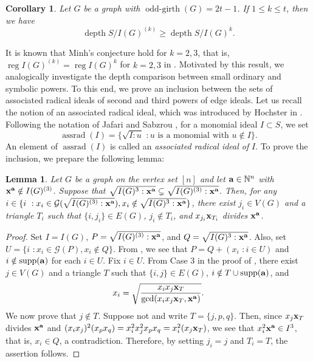 \documentclass[12pt]{amsart}
\newtheorem{cor}[thm]{Corollary}
\newtheorem{lemma}[thm]{Lemma}
\theoremstyle{definition}
\theoremstyle{remark}
\DeclareMathOperator{\depth}{depth}
\DeclareMathOperator{\supp}{supp}
\DeclareMathOperator{\reg}{reg}
\DeclareMathOperator{\ogirth}{odd-girth}
\DeclareMathOperator{\assrad}{assrad}
\begin{document}
\begin{cor}
Let $G$ be a graph with $\ogirth(G)=2t-1$. If $1\leq k\leq t$, then we have $$\depth S/I(G)^{(k)}\geq\depth S/I(G)^{k}.$$ 
\end{cor}

It is known that Minh's conjecture hold for $k=2,3$, that is, $\reg I(G)^{(k)}=\reg I(G)^{k}$ for $k=2,3$ in \cite[Theorem 1.1]{mnptv2022}. Motivated by this result, we analogically investigate the depth comparison between small ordinary and symbolic powers. To this end, we prove an inclusion between the sets of associated radical ideals of second and third powers of edge ideals. Let us recall the notion of an associated radical ideal, which was introduced by Hochster in \cite{h1977}. Following the notation of Jafari and Sabzrou \cite{js2019}, for a monomial ideal $I\subset S$, we set 
$$\assrad(I)=\{\sqrt{I:u}\,\,: u\mbox{ is a monomial with }u\notin I\}.$$
An element of $\assrad(I)$ is called an {\it associated radical ideal of }$I$. 
To prove the inclusion, we prepare the following lemma: 


\begin{lemma}\label{lemma for assrad}
Let $G$ be a graph on the vertex set $[n]$ and let ${\bf a}\in\mathbb{N}^{n}$ with ${\bf x}^{\bf a}\notin I(G)^{(3)}$. Suppose that $\sqrt{I(G)^{3}:{\bf x}^{\bf a}}\subsetneq\sqrt{I(G)^{(3)}:{\bf x}^{\bf a}}$. Then, for any $i\in\{i\,\,: x_{i}\in\mathcal{G}(\sqrt{I(G)^{(3)}:{\bf x}^{\bf a}}), x_{i}\notin \sqrt{I(G)^{3}:{\bf x}^{\bf a}}\}$, there exist $j_{i}\in V(G)$ and a triangle $T_{i}$ such that $\{i,j_{i}\}\in E(G)$, $j_{i}\notin T_{i}$, and $x_{j_{i}}{\bf x}_{T_{i}}$ divides ${\bf x}^{\bf a}$. 
\end{lemma}
\begin{proof}
Set $I=I(G)$, $P=\sqrt{I(G)^{(3)}:{\bf x}^{\bf a}}$, and $Q=\sqrt{I(G)^{3}:{\bf x}^{\bf a}}$. Also, set $U=\{i\,\,: x_{i}\in\mathcal{G}(P), x_{i}\notin Q\}$. From \cite[Lemma 4.1]{mnptv2022}, we see that $P=Q+(x_{i}\,\,: i\in U)$ and $i\notin\supp({\bf a})$ for each $i\in U$. Fix $i\in U$. From Case 3 in the proof of \cite[Lemma 4.1]{mnptv2022}, there exist $j\in V(G)$ and a triangle $T$ such that $\{i,j\}\in E(G)$, $i\notin T\cup\supp({\bf a})$, and $$x_{i}=\sqrt{\frac{x_{i}x_{j}{\bf x}_{T}}{\gcd(x_{i}x_{j}{\bf x}_{T}, {\bf x}^{\bf a})}}.$$ 
We now prove that $j\notin T$. Suppose not and write $T=\{j,p,q\}$. Then, since  $x_{j}{\bf x}_{T}$ divides ${\bf x}^{\bf a}$ and $(x_{i}x_{j})^{2}(x_{p}x_{q})=x_{i}^{2}x_{j}^{2}x_{p}x_{q}=x_{i}^{2}(x_{j}{\bf x}_{T})$, we see that $x_{i}^{2}{\bf x}^{\bf a}\in I^{3}$, that is, $x_{i}\in Q$, a contradiction. Therefore, by setting $j_{i}=j$ and $T_{i}=T$, the assertion follows. 
\end{proof}
\end{document}
